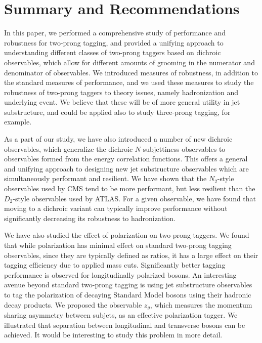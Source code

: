 \documentclass[11pt,letterpaper]{article}
\begin{document}
\section{Summary and Recommendations}\label{jetsub_2prong_sec:conc}

In this paper, we performed a comprehensive study of performance and robustness for two-prong tagging, and provided a unifying approach to understanding different classes of two-prong taggers based on dichroic observables, which allow for different amounts of grooming in the numerator and denominator of observables.
%
We introduced measures of robustness, in addition to the standard measures of performance, and we used these measures to study the robustness of two-prong taggers to theory issues, namely hadronization and underlying event.
%
We believe that these will be of more general utility in jet substructure, and could be applied also to study three-prong tagging, for example.

As a part of our study, we have also introduced a number of new dichroic observables, which generalize the dichroic $N$-subjettiness observables to observables formed from the energy correlation functions.
%
This offers a general and unifying approach to designing new jet substructure observables which are simultaneously performant and resilient.
%
We have shown that the $N_2$-style observables used by CMS tend to be more performant, but less resilient than the $D_2$-style observables used by ATLAS.
%
For a given observable, we have found that moving to a dichroic variant can typically improve performance without significantly decreasing its robustness to hadronization.

We have also studied the effect of polarization on two-prong taggers.
%
We found that while polarization has minimal effect on standard two-prong tagging observables, since they are typically defined as ratios, it has a large effect on their tagging efficiency due to applied mass cuts.
%
Significantly better tagging performance is observed for longitudinally polarized bosons.
%
An interesting avenue beyond standard two-prong tagging is using jet substructure observables to tag the polarization of decaying Standard Model bosons using their hadronic decay products.
%
We proposed the observable $z_g$, which measures the momentum sharing asymmetry between subjets, as an effective polarization tagger.
%
We illustrated that separation between longitudinal and transverse bosons can be achieved.
%
It would be interesting to study this problem in more detail.
\end{document}
